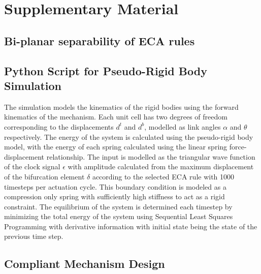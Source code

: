 \appendix
\section{Supplementary Material}
\subsection*{Bi-planar separability of ECA rules}
\label{sec:Bi-planar separability of ECA rules}
\subsection*{Python Script for Pseudo-Rigid Body Simulation}
The simulation models the kinematics of the rigid bodies using the forward kinematics of the mechanism. Each unit cell has two degrees of freedom corresponding to the displacements \( d^t \) and \( d^b \), modelled as link angles \(\alpha\) and \(\theta\) respectively. The energy of the system is calculated using the pseudo-rigid body model, with the energy of each spring calculated using the linear spring force-displacement relationship. The input is modelled as the triangular wave function of the clock signal \(\epsilon\) with amplitude calculated from the maximum displacement of the bifurcation element \( \delta \) according to the selected ECA rule with 1000 timesteps per actuation cycle. This boundary condition is modeled as a compression only spring with sufficiently high stiffness to act as a rigid constraint. The equilibrium of the system is determined each timestep by minimizing the total energy of the system using Sequential Least Squares Programming with derivative information with initial state being the state of the previous time step. 
\label{sec:Python Script for Pseudo-Rigid Body Simulation}


\subsection*{Compliant Mechanism Design}
\label{sec:Compliant Mechanism Design}

